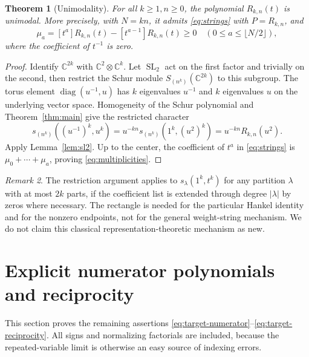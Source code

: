 \documentclass[11pt,a4paper]{article}
\newtheorem{theorem}{Theorem}[section]
\theoremstyle{definition}
\theoremstyle{remark}
\newtheorem{remark}[theorem]{Remark}
\newcommand{\C}{\mathbb C}
\newcommand{\SL}{\operatorname{SL}}
\newcommand{\diag}{\operatorname{diag}}
\numberwithin{equation}{section}
\begin{document}
\begin{theorem}[Unimodality]
\label{thm:unimodal}
For all \(k\ge1,n\ge0\), the polynomial \(R_{k,n}(t)\) is unimodal.
More precisely, with \(N=kn\), it admits \eqref{eq:strings} with
\(P=R_{k,n}\), and
\begin{equation}
 \mu_a=[t^a]R_{k,n}(t)-[t^{a-1}]R_{k,n}(t)\ge0
 \quad(0\le a\le\lfloor N/2\rfloor),
 \label{eq:multiplicities}
\end{equation}
where the coefficient of \(t^{-1}\) is zero.
\end{theorem}
\begin{proof}
Identify \(\C^{2k}\) with \(\C^2\otimes\C^k\). Let \(\SL_2\) act on
the first factor and trivially on the second, then restrict the Schur module
\(S_{(n^k)}(\C^{2k})\) to this subgroup. The torus element
\(\diag(u^{-1},u)\) has \(k\) eigenvalues \(u^{-1}\) and \(k\)
eigenvalues \(u\) on the underlying vector space. Homogeneity of the Schur
polynomial and Theorem~\ref{thm:main} give the restricted character
\[
 s_{(n^k)}((u^{-1})^k,u^k)=u^{-kn}s_{(n^k)}(1^k,(u^2)^k)
                       =u^{-kn}R_{k,n}(u^2).
\]
Apply Lemma~\ref{lem:sl2}. Up to the center, the coefficient of \(t^a\)
in \eqref{eq:strings} is \(\mu_0+\cdots+\mu_a\), proving
\eqref{eq:multiplicities}.
\end{proof}

\begin{remark}
The restriction argument applies to \(s_\lambda(1^k,t^k)\) for any
partition \(\lambda\) with at most \(2k\) parts, if the coefficient list
is extended through degree \(|\lambda|\) by zeros where necessary.
The rectangle is needed for the particular Hankel identity and for the
nonzero endpoints, not for the general weight-string mechanism.
We do not claim this classical representation-theoretic mechanism as new.
\end{remark}

\section{Explicit numerator polynomials and reciprocity}
\label{sec:numerator}
This section proves the remaining assertions
\eqref{eq:target-numerator}--\eqref{eq:target-reciprocity}. All signs and
normalizing factorials are included, because the repeated-variable limit is
otherwise an easy source of indexing errors.
\end{document}
